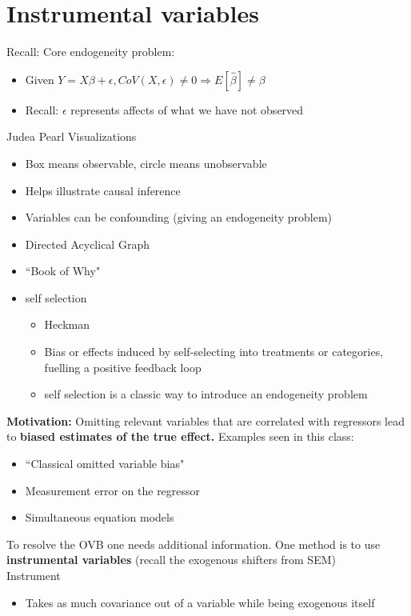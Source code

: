 \documentclass[10pt, oneside]{article}
\begin{document}
\section{Instrumental variables}
Recall: Core endogeneity problem:
\begin{itemize}
    \item Given $Y= X\beta + \epsilon, CoV(X,\epsilon)\neq 0 \Rightarrow E[\hat \beta] \neq \beta$
    \item Recall: $\epsilon$ represents affects of what we have not observed
\end{itemize}
Judea Pearl Visualizations
\begin{itemize}
    \item Box means observable, circle means unobservable
    \item Helps illustrate causal inference
    \item Variables can be confounding (giving an endogeneity problem)
    \item Directed Acyclical Graph
    \item ``Book of Why"
    \item self selection
    \begin{itemize}
        \item Heckman
        \item Bias or effects induced by self-selecting into treatments or categories, fuelling a positive feedback loop
        \item self selection is a classic way to introduce an endogeneity problem
    \end{itemize}
\end{itemize}

\textbf{Motivation:} Omitting relevant variables that are correlated with regressors lead to \textbf{biased estimates of the true effect.} Examples seen in this class:
\begin{itemize}
    \item ``Classical omitted variable bias"
    \item Measurement error on the regressor
    \item Simultaneous equation models
\end{itemize}
To resolve the OVB one needs additional information. One method is to use \textbf{instrumental variables} (recall the exogenous shifters from SEM)\\
Instrument
\begin{itemize}
    \item Takes as much covariance out of a variable while being exogenous itself
\end{itemize}
\end{document}
